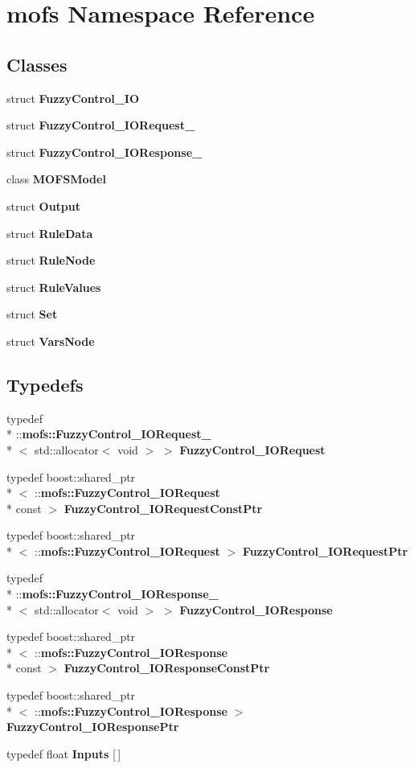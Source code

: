 \section{mofs Namespace Reference}
\label{namespacemofs}
\subsection*{Classes}
\begin{DoxyCompactItemize}
\item 
struct {\bf Fuzzy\-Control\-\_\-\-I\-O}
\item 
struct {\bf Fuzzy\-Control\-\_\-\-I\-O\-Request\-\_\-}
\item 
struct {\bf Fuzzy\-Control\-\_\-\-I\-O\-Response\-\_\-}
\item 
class {\bf M\-O\-F\-S\-Model}
\item 
struct {\bf Output}
\item 
struct {\bf Rule\-Data}
\item 
struct {\bf Rule\-Node}
\item 
struct {\bf Rule\-Values}
\item 
struct {\bf Set}
\item 
struct {\bf Vars\-Node}
\end{DoxyCompactItemize}
\subsection*{Typedefs}
\begin{DoxyCompactItemize}
\item 
typedef \\*
\-::{\bf mofs\-::\-Fuzzy\-Control\-\_\-\-I\-O\-Request\-\_\-}\\*
$<$ std\-::allocator$<$ void $>$ $>$ {\bf Fuzzy\-Control\-\_\-\-I\-O\-Request}
\item 
typedef boost\-::shared\-\_\-ptr\\*
$<$ \-::{\bf mofs\-::\-Fuzzy\-Control\-\_\-\-I\-O\-Request} \\*
const  $>$ {\bf Fuzzy\-Control\-\_\-\-I\-O\-Request\-Const\-Ptr}
\item 
typedef boost\-::shared\-\_\-ptr\\*
$<$ \-::{\bf mofs\-::\-Fuzzy\-Control\-\_\-\-I\-O\-Request} $>$ {\bf Fuzzy\-Control\-\_\-\-I\-O\-Request\-Ptr}
\item 
typedef \\*
\-::{\bf mofs\-::\-Fuzzy\-Control\-\_\-\-I\-O\-Response\-\_\-}\\*
$<$ std\-::allocator$<$ void $>$ $>$ {\bf Fuzzy\-Control\-\_\-\-I\-O\-Response}
\item 
typedef boost\-::shared\-\_\-ptr\\*
$<$ \-::{\bf mofs\-::\-Fuzzy\-Control\-\_\-\-I\-O\-Response} \\*
const  $>$ {\bf Fuzzy\-Control\-\_\-\-I\-O\-Response\-Const\-Ptr}
\item 
typedef boost\-::shared\-\_\-ptr\\*
$<$ \-::{\bf mofs\-::\-Fuzzy\-Control\-\_\-\-I\-O\-Response} $>$ {\bf Fuzzy\-Control\-\_\-\-I\-O\-Response\-Ptr}
\item 
typedef float {\bf Inputs} [$\,$]
\end{DoxyCompactItemize}


